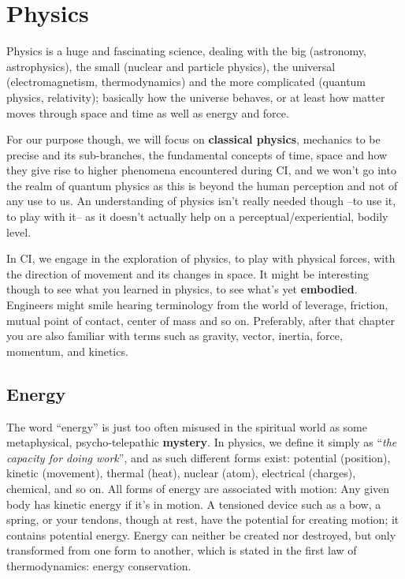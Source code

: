 \chapter{Physics}\label{ch:physics}


Physics is a huge and fascinating science, dealing with the big (astronomy, astrophysics), the small (nuclear and particle physics), the universal (electromagnetism, thermodynamics) and the more complicated (quantum physics, relativity); basically how the universe behaves, or at least how matter moves through space and time as well as energy and force.

For our purpose though, we will focus on \textbf{classical physics}, mechanics to be precise and its sub-branches, the fundamental concepts of time, space and how they give rise to higher phenomena encountered during CI, and we won't go into the realm of quantum physics as this is beyond the human perception and not of any use to us.
An understanding of physics isn't really needed though --to use it, to play with it-- as it doesn't actually help on a perceptual/experiential, bodily level.

In CI, we engage in the exploration of physics, to play with physical forces, with the direction of movement and its changes in space.
It might be interesting though to see what you learned in physics, to see what's yet \textbf{embodied}.
Engineers might smile hearing terminology from the world of leverage, friction, mutual point of contact, center of mass and so on.
Preferably, after that chapter you are also familiar with terms such as gravity, vector, inertia, force, momentum, and kinetics.

\section{Energy}\label{sec:energy}

The word ``energy'' is just too often misused in the spiritual world as some metaphysical, psycho-telepathic \textbf{mystery}.
In physics, we define it simply as ``\textit{the capacity for doing work}'', and as such different forms exist: potential (position), kinetic (movement), thermal (heat), nuclear (atom), electrical (charges), chemical, and so on.
All forms of energy are associated with motion: Any given body has kinetic energy if it's in motion.
A tensioned device such as a bow, a spring, or your tendons, though at rest, have the potential for creating motion; it contains potential energy.
Energy can neither be created nor destroyed, but only transformed from one form to another, which is stated in the first law of thermodynamics: energy conservation.

